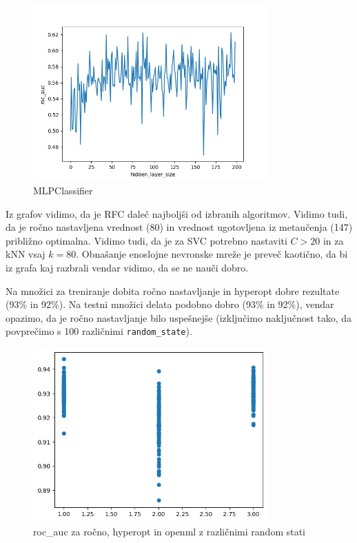 \documentclass{article}
\begin{document}
\begin{figure}[h!]
    \caption{MLPClassifier}
    \centering
    \includegraphics[width=0.8\textwidth]{mlp}
\end{figure}

Iz grafov vidimo, da je RFC daleč najboljši od izbranih algoritmov. Vidimo tudi, da je ročno nastavljena vrednost (80) in vrednost ugotovljena iz metaučenja (147) približno optimalna. Vidimo tudi, da je za SVC potrebno nastaviti $C>20$ in za kNN vsaj $k=80$. Obnašanje enoslojne nevronske mreže je preveč kaotično, da bi iz grafa kaj razbrali vendar vidimo, da se ne nauči dobro.

Na množici za treniranje dobita ročno nastavljanje in hyperopt dobre rezultate (93\% in 92\%). Na testni množici delata podobno dobro (93\% in 92\%), vendar opazimo, da je ročno nastavljanje bilo uspešnejše (izključimo naključnost tako, da povprečimo s 100 različnimi \verb|random_state|).
\begin{figure}[h]
    \caption{roc\_auc za ročno, hyperopt in openml z različnimi random stati}
    \centering
    \includegraphics[width=0.8\textwidth]{scores}
\end{figure}
\end{document}
